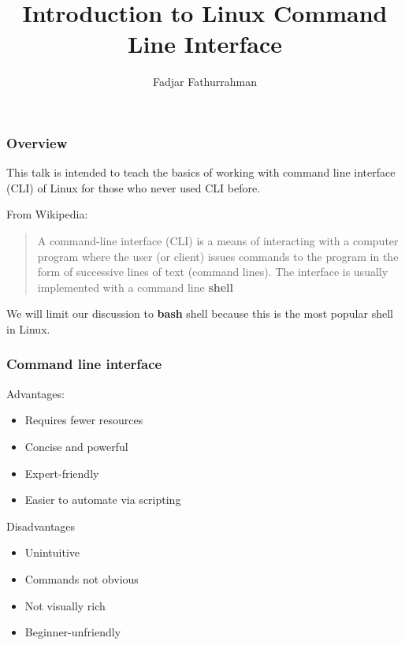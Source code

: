 \documentclass[english,11pt]{beamer}
\begin{document}
\title{Introduction to Linux Command Line Interface}
\author{Fadjar Fathurrahman}
\date{}
\maketitle

\begin{frame}
\frametitle{Overview}

This talk is intended to teach the basics of working with
command line interface (CLI) of Linux for those who never
used CLI before.

From Wikipedia:

\begin{quotation}
A command-line interface (CLI) is a means of interacting with a computer
program where the user (or client) issues commands to the program in the
form of successive lines of text (command lines).
The interface is usually implemented with a command line \textbf{shell}
\end{quotation}

We will limit our discussion to \textbf{bash} shell because this is the most popular
shell in Linux.
\end{frame}


\begin{frame}
\frametitle{Command line interface}

Advantages:
\begin{itemize}
\item Requires fewer resources
\item Concise and powerful
\item Expert-friendly
\item Easier to automate via scripting
\end{itemize}

Disadvantages
\begin{itemize}
\item Unintuitive
\item Commands not obvious
\item Not visually rich
\item Beginner-unfriendly
\end{itemize}

\end{frame}
\end{document}
